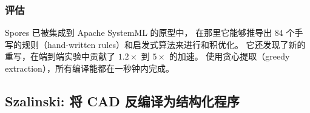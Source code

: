 \subsubsection{评估}

Spores 已被集成到 Apache SystemML \cite{Boehm_2019} 的原型中，
在那里它能够推导出 84 个手写的规则（hand-written rules）和启发式算法来进行和积优化。
它还发现了新的重写，在端到端实验中贡献了 $1.2\times$ 到 $5\times$ 的加速。
使用贪心提取（greedy extraction），所有编译能都在一秒钟内完成。 %


\subsection{Szalinski: 将 CAD 反编译为结构化程序}
\label{sec:szalinski}

